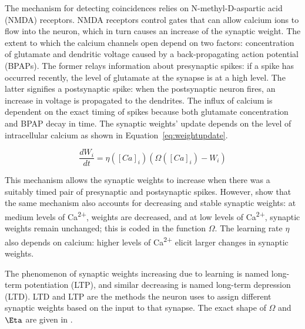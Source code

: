 \documentclass[a4paper,12pt]{report}
\theoremstyle{definition}
\begin{document}

The mechanism for detecting coincidences relies on N-methyl-D-aspartic acid (NMDA) receptors. NMDA receptors control gates that can allow calcium ions to flow into the neuron, which in turn causes an increase of the synaptic weight. The extent to which the calcium channels open depend on two factors: concentration of glutamate and dendritic voltage caused by a back-propagating action potential (BPAPs). The former relays information about presynaptic spikes: if a spike has occurred recently, the level of glutamate at the synapse is at a high level. The latter signifies a postsynaptic spike: when the postsynaptic neuron fires, an increase in voltage is propagated to the dendrites. The influx of calcium is dependent on the exact timing of spikes because both glutamate concentration and BPAP decay in time. The synaptic weights' update depends on the level of intracellular calcium as shown in Equation~\ref{eq:weightupdate}.

\begin{equation}
\frac{dW_i}{dt} = \eta ([Ca]_i) (\Omega([Ca]_i) - W_i)
\label{eq:weightupdate}
\end{equation}

This mechanism allows the synaptic weights to increase when there was a suitably timed pair of presynaptic and postsynaptic spikes. However, \cite{shouval2002unified} show that the same mechanism also accounts for decreasing and stable synaptic weights: at medium levels of Ca\textsuperscript{2+}, weights are decreased, and at low levels of Ca\textsuperscript{2+}, synaptic weights remain unchanged; this is coded in the function $\Omega$. The learning rate $\eta$ also depends on calcium: higher levels of Ca\textsuperscript{2+} elicit larger changes in synaptic weights.

The phenomenon of synaptic weights increasing due to learning is named long-term potentiation (LTP), and similar decreasing is named long-term depression (LTD). LTD and LTP are the methods the neuron uses to assign different synaptic weights based on the input to that synapse. The exact shape of $\Omega$ and $\Eta$ are given in \cite{shouval2002unified}.


\end{document}
